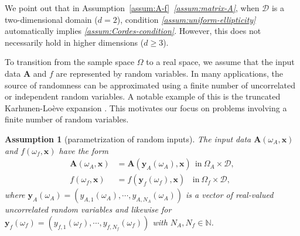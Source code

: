 \documentclass[final,onefignum,onetabnum]{mousaviart}
\newtheorem{assumption}{Assumption}
\newcounter{example}
\begin{document}
	We point out that in Assumption~\ref{assum:A-f}~\textit{\ref{assum:matrix-A}}, when $\mathcal{D}$ is a two-dimensional domain ($d=2$), condition \textit{\ref{assum:uniform-ellipticity}} automatically implies \textit{\ref{assum:Cordes-condition}}. However, this does not necessarily hold in higher dimensions ($d \geq 3$).
	
	To transition from the sample space $\Omega$ to a real space, we assume that the input data $\boldsymbol{A}$ and $f$ are represented by random variables. In many applications, the source of randomness can be approximated using a finite number of uncorrelated or independent random variables. A notable example of this is the truncated Karhunen-Loève expansion \cite{Levy}. This motivates our focus on problems involving a finite number of random variables.
	
	\vspace*{1mm}
	\begin{assumption}[parametrization of random inputs]
		\label{assum:random-data}
		The input data $\boldsymbol{A}(\omega_A, \boldsymbol{x})$ and $f(\omega_f, \boldsymbol{x})$ have the form 
		\begin{equation}
			\begin{split}
				\boldsymbol{A}(\omega_A, \boldsymbol{x}) &= 
				\boldsymbol{A}(\boldsymbol{y}_{A}(\omega_A), \boldsymbol{x})
				~~ \mathrm{in}~  \Omega_{A} \times \mathcal{D},
				\\
				f(\omega_f, \boldsymbol{x}) &= 
				f(\boldsymbol{y}_{f}(\omega_f), \boldsymbol{x})
				~~~~ \mathrm{in}~ \Omega_{f} \times \mathcal{D},
			\end{split}
		\end{equation}
		where $\boldsymbol{y}_{A}(\omega_A)= \left( 
		y_{A,1}(\omega_{A}), \cdots, y_{A,N_{A}}(\omega_{A})
		\right) $
		is a vector of real-valued uncorrelated random variables and likewise for 
		$\boldsymbol{y}_{f}(\omega_f)= \left( 
		y_{f,1}(\omega_{f}), \cdots, y_{f,N_{f}}(\omega_{f})
		\right) $
		with $N_{A}, N_{f} \in \mathbb{N}$.
	\end{assumption}
	
\end{document}
